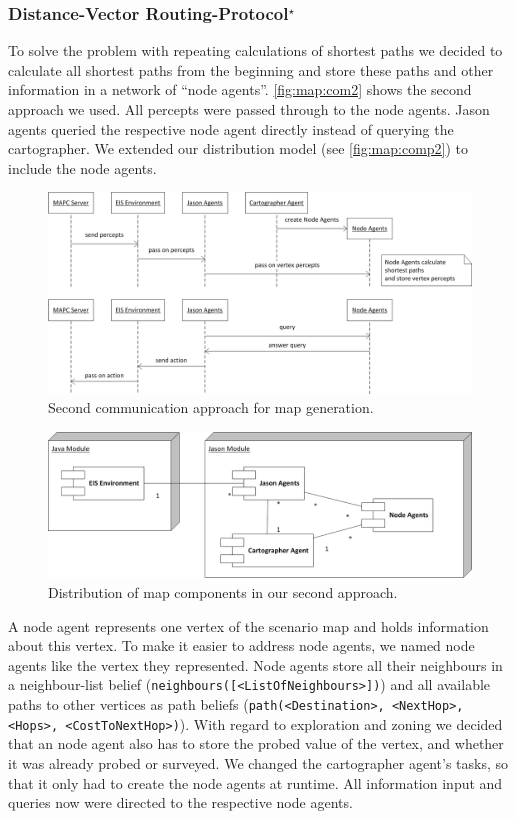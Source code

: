 \subsubsection[Distance-Vector Routing Protocol]{Distance-Vector Routing-Protocol$^\star$}\label{alg:map_dv}
To solve the problem with repeating calculations of shortest paths we decided to calculate all shortest paths from the beginning and store these paths and other information in a network of ``node agents''.
\autoref{fig:map:com2} shows the second approach we used.
All percepts were passed through to the node agents.
Jason agents queried the respective node agent directly instead of querying the cartographer.
We extended our distribution model (see \autoref{fig:map:comp2}) to include the node agents.
\begin{figure}
  \centering
  \includegraphics[width=\linewidth]{images/map_com_2.png}
  \caption{Second communication approach for map generation.}
  \label{fig:map:com2}
\end{figure}

\begin{figure}
  \centering
  \includegraphics[width=\linewidth]{images/map_comp_2.png}
  \caption{Distribution of map components in our second approach.}
  \label{fig:map:comp2}
\end{figure}

A node agent represents one vertex of the scenario map and holds information about this vertex.
To make it easier to address node agents, we named node agents like the vertex they represented.
Node agents store all their neighbours in a neighbour-list belief (\texttt{neighbours([<ListOfNeighbours>])}) and all available paths to other vertices as path beliefs (\texttt{path(<Destination>, <NextHop>, <Hops>, <CostToNextHop>)}).
With regard to exploration and zoning we decided that an node agent also has to store the probed value of the vertex, and whether it was already probed or surveyed.
We changed the cartographer agent's tasks, so that it only had to create the node agents at runtime.
All information input and queries now were directed to the respective node agents.

